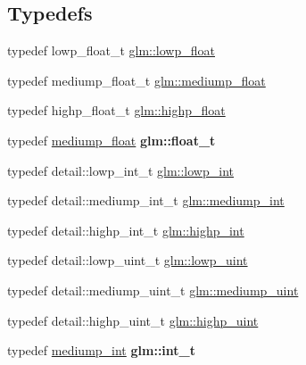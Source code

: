 \subsection*{Typedefs}
\begin{DoxyCompactItemize}
\item 
typedef lowp\+\_\+float\+\_\+t \hyperlink{group__core__precision_ga2887fbc729ac5c1c5caeb7cd57a7145c}{glm\+::lowp\+\_\+float}
\item 
typedef mediump\+\_\+float\+\_\+t \hyperlink{group__core__precision_gac785826c039fe6c97c03b37c81c1a68e}{glm\+::mediump\+\_\+float}
\item 
typedef highp\+\_\+float\+\_\+t \hyperlink{group__core__precision_ga3d443a093adc053638ed7f81c5bfe300}{glm\+::highp\+\_\+float}
\item 
\mbox{\label{group__core__precision_gae01b87f81bd15327230bf1b47c482b24}} 
typedef \hyperlink{group__core__precision_gac785826c039fe6c97c03b37c81c1a68e}{mediump\+\_\+float} {\bfseries glm\+::float\+\_\+t}
\item 
typedef detail\+::lowp\+\_\+int\+\_\+t \hyperlink{group__core__precision_ga4681244bf4a184734f03aa9df4e3d288}{glm\+::lowp\+\_\+int}
\item 
typedef detail\+::mediump\+\_\+int\+\_\+t \hyperlink{group__core__precision_ga2a3dcbcd7f4e17663d393a12061ac6ac}{glm\+::mediump\+\_\+int}
\item 
typedef detail\+::highp\+\_\+int\+\_\+t \hyperlink{group__core__precision_gaafed5240eb0a43328cb75faf5fb0a8c2}{glm\+::highp\+\_\+int}
\item 
typedef detail\+::lowp\+\_\+uint\+\_\+t \hyperlink{group__core__precision_ga8077c90f2c87e419ea6c273157dcc1fc}{glm\+::lowp\+\_\+uint}
\item 
typedef detail\+::mediump\+\_\+uint\+\_\+t \hyperlink{group__core__precision_ga08ae38ad78ade3539fdd1d25052b8c51}{glm\+::mediump\+\_\+uint}
\item 
typedef detail\+::highp\+\_\+uint\+\_\+t \hyperlink{group__core__precision_gabfd1cf11193324a5f77d3831b6ac3205}{glm\+::highp\+\_\+uint}
\item 
\mbox{\label{group__core__precision_gacd01d170508f812968875b0f2e730e8c}} 
typedef \hyperlink{group__core__precision_ga2a3dcbcd7f4e17663d393a12061ac6ac}{mediump\+\_\+int} {\bfseries glm\+::int\+\_\+t}
\item 
\mbox{\label{group__core__precision_ga5f2ae871c284c9d39ae8fdbb1305b566}} 

\end{DoxyCompactItemize}
